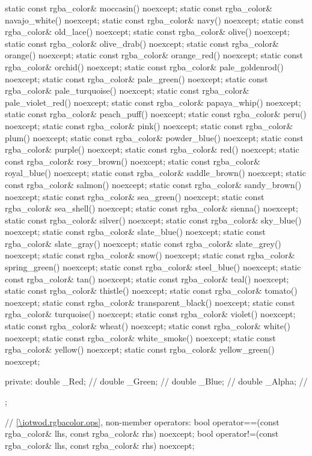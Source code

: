 \begin{codeblock}
{{{{{    static const rgba_color& moccasin() noexcept;
    static const rgba_color& navajo_white() noexcept;
    static const rgba_color& navy() noexcept;
    static const rgba_color& old_lace() noexcept;
    static const rgba_color& olive() noexcept;
    static const rgba_color& olive_drab() noexcept;
    static const rgba_color& orange() noexcept;
    static const rgba_color& orange_red() noexcept;
    static const rgba_color& orchid() noexcept;
    static const rgba_color& pale_goldenrod() noexcept;
    static const rgba_color& pale_green() noexcept;
    static const rgba_color& pale_turquoise() noexcept;
    static const rgba_color& pale_violet_red() noexcept;
    static const rgba_color& papaya_whip() noexcept;
    static const rgba_color& peach_puff() noexcept;
    static const rgba_color& peru() noexcept;
    static const rgba_color& pink() noexcept;
    static const rgba_color& plum() noexcept;
    static const rgba_color& powder_blue() noexcept;
    static const rgba_color& purple() noexcept;
    static const rgba_color& red() noexcept;
    static const rgba_color& rosy_brown() noexcept;
    static const rgba_color& royal_blue() noexcept;
    static const rgba_color& saddle_brown() noexcept;
    static const rgba_color& salmon() noexcept;
    static const rgba_color& sandy_brown() noexcept;
    static const rgba_color& sea_green() noexcept;
    static const rgba_color& sea_shell() noexcept;
    static const rgba_color& sienna() noexcept;
    static const rgba_color& silver() noexcept;
    static const rgba_color& sky_blue() noexcept;
    static const rgba_color& slate_blue() noexcept;
    static const rgba_color& slate_gray() noexcept;
    static const rgba_color& slate_grey() noexcept;
    static const rgba_color& snow() noexcept;
    static const rgba_color& spring_green() noexcept;
    static const rgba_color& steel_blue() noexcept;
    static const rgba_color& tan() noexcept;
    static const rgba_color& teal() noexcept;
    static const rgba_color& thistle() noexcept;
    static const rgba_color& tomato() noexcept;
    static const rgba_color& transparent_black() noexcept;
    static const rgba_color& turquoise() noexcept;
    static const rgba_color& violet() noexcept;
    static const rgba_color& wheat() noexcept;
    static const rgba_color& white() noexcept;
    static const rgba_color& white_smoke() noexcept;
    static const rgba_color& yellow() noexcept;
    static const rgba_color& yellow_green() noexcept;

private:
    double _Red;   // \expos
    double _Green; // \expos
    double _Blue;  // \expos
    double _Alpha; // \expos
  };

  // \ref{\iotwod.rgbacolor.ops}, non-member operators:
  bool operator==(const rgba_color& lhs, const rgba_color& rhs) noexcept;
  bool operator!=(const rgba_color& lhs, const rgba_color& rhs) noexcept;
} } } }
\end{codeblock}

